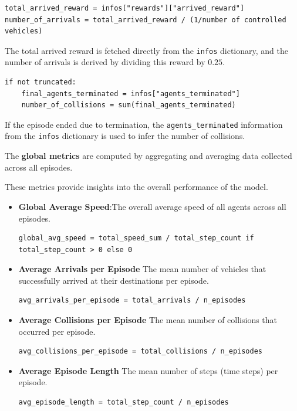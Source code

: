 \begin{verbatim}
total_arrived_reward = infos["rewards"]["arrived_reward"]
number_of_arrivals = total_arrived_reward / (1/number of controlled vehicles)
\end{verbatim}
The total arrived reward is fetched directly from the \texttt{infos} dictionary, and the number of arrivals is derived by dividing this reward by \(0.25\).

\begin{verbatim}
if not truncated:
    final_agents_terminated = infos["agents_terminated"]
    number_of_collisions = sum(final_agents_terminated)
\end{verbatim}
If the episode ended due to termination, the \texttt{agents\_terminated} information from the \texttt{infos} dictionary is used to infer the number of collisions.



The \textbf{global metrics} are computed by aggregating and averaging data collected across all episodes. 

These metrics provide insights into the overall performance of the model.

\begin{itemize}
\item\textbf{Global Average Speed}:The overall average speed of all agents across all episodes.  
\begin{verbatim}
global_avg_speed = total_speed_sum / total_step_count if total_step_count > 0 else 0
\end{verbatim}

\item\textbf{Average Arrivals per Episode} The mean number of vehicles that successfully arrived at their destinations per episode. 
\begin{verbatim}
avg_arrivals_per_episode = total_arrivals / n_episodes
\end{verbatim}


\item\textbf{Average Collisions per Episode} The mean number of collisions that occurred per episode. 
\begin{verbatim}
avg_collisions_per_episode = total_collisions / n_episodes
\end{verbatim}


\item\textbf{Average Episode Length} The mean number of steps (time steps) per episode.
\begin{verbatim}
avg_episode_length = total_step_count / n_episodes
\end{verbatim}
\end{itemize}

